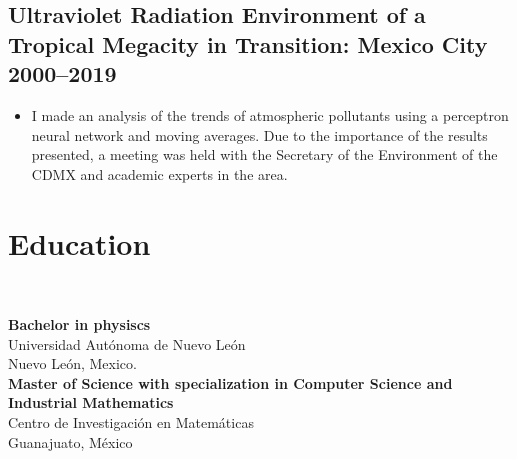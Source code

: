 \documentclass[a3paper]{adcv_color}
\begin{document}
\begin{addmargin}[0.5em]{0.5em}
	\subsection{Ultraviolet Radiation Environment of a Tropical Megacity in Transition: Mexico City 2000–2019}
	\begin{itemize}
		\item I made an analysis of the trends of atmospheric pollutants using a perceptron neural network and moving averages. Due to the importance of the results presented, a meeting was held with the Secretary of the Environment of the CDMX and academic experts in the area.
	\end{itemize}
\end{addmargin}
\begin{minipage}{0.35\linewidth}
	\section{Education}\\
	\begin{addmargin}[0.5em]{0.5em}

		\textbf{Bachelor in physiscs}\\
		Universidad Autónoma de Nuevo León\\
		Nuevo León, Mexico.\\

		\textbf{Master of Science with specialization in Computer Science and Industrial Mathematics}\\
		Centro de Investigación en Matemáticas\\
		Guanajuato, México
	\end{addmargin}
\end{minipage}
\end{document}
